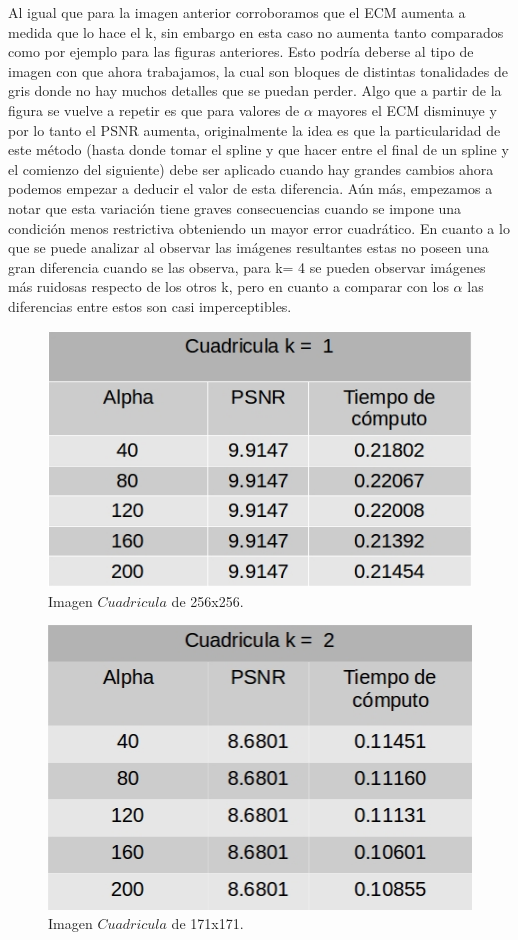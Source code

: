 \documentclass[a4paper]{article}
\begin{document}
    
Al igual que para la imagen anterior corroboramos que el ECM aumenta a medida que lo hace el k, sin embargo en esta caso no aumenta tanto comparados como por ejemplo para las figuras anteriores. Esto podría deberse al tipo de imagen con que ahora trabajamos, la cual son bloques de distintas tonalidades de gris donde no hay muchos detalles que se puedan perder. Algo que a partir de la figura se vuelve a repetir es que para valores de $\alpha$ mayores el ECM disminuye y por lo tanto el PSNR aumenta, originalmente la idea es que la particularidad de este método (hasta donde tomar el spline y que hacer entre el final de un spline y el comienzo del siguiente) debe ser aplicado cuando hay grandes cambios ahora podemos empezar a deducir el valor de esta diferencia. Aún más, empezamos a notar que esta variación tiene graves consecuencias cuando se impone una condición menos restrictiva  obteniendo un mayor error cuadrático. En cuanto a lo que se puede analizar al observar las imágenes resultantes estas no poseen una gran diferencia cuando se las observa, para k= 4 se pueden observar imágenes más ruidosas respecto de los otros k, pero en cuanto a comparar con los $\alpha$ las diferencias entre estos son casi imperceptibles.              
     

\begin{figure}[H]
    \centering
    \includegraphics[scale=0.4]{imagenes/cua1.jpg}
    \caption{Imagen $Cuadricula$ de 256x256.}
	\label{cuade1}
    \end{figure}
    
\begin{figure}[H]
    \centering
    \includegraphics[scale=0.4]{imagenes/cua2.jpg}
    \caption{Imagen $Cuadricula$ de 171x171.}
	\label{cuade2}
    \end{figure}
    
\end{document}
